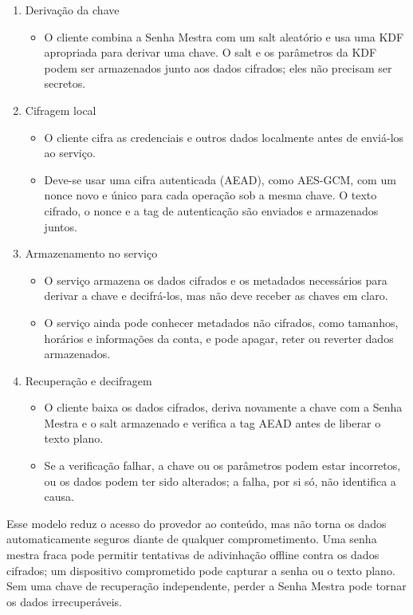 \documentclass{article}
\begin{document}
\begin{enumerate}
	\item Derivação da chave
		\begin{itemize}
			\item O cliente combina a Senha Mestra com um salt aleatório e usa uma KDF apropriada para derivar uma chave. O salt e os parâmetros da KDF podem ser armazenados junto aos dados cifrados; eles não precisam ser secretos.
		\end{itemize}
	\item Cifragem local
		\begin{itemize}
			\item O cliente cifra as credenciais e outros dados localmente antes de enviá-los ao serviço.
			\item Deve-se usar uma cifra autenticada (AEAD), como AES-GCM, com um nonce novo e único para cada operação sob a mesma chave. O texto cifrado, o nonce e a tag de autenticação são enviados e armazenados juntos.
		\end{itemize}
	\item Armazenamento no serviço
		\begin{itemize}
			\item O serviço armazena os dados cifrados e os metadados necessários para derivar a chave e decifrá-los, mas não deve receber as chaves em claro.
			\item O serviço ainda pode conhecer metadados não cifrados, como tamanhos, horários e informações da conta, e pode apagar, reter ou reverter dados armazenados.
		\end{itemize}
	\item Recuperação e decifragem
		\begin{itemize}
			\item O cliente baixa os dados cifrados, deriva novamente a chave com a Senha Mestra e o salt armazenado e verifica a tag AEAD antes de liberar o texto plano.
			\item Se a verificação falhar, a chave ou os parâmetros podem estar incorretos, ou os dados podem ter sido alterados; a falha, por si só, não identifica a causa.
		\end{itemize}
\end{enumerate}

Esse modelo reduz o acesso do provedor ao conteúdo, mas não torna os dados automaticamente seguros diante de qualquer comprometimento. Uma senha mestra fraca pode permitir tentativas de adivinhação offline contra os dados cifrados; um dispositivo comprometido pode capturar a senha ou o texto plano. Sem uma chave de recuperação independente, perder a Senha Mestra pode tornar os dados irrecuperáveis.
\end{document}
